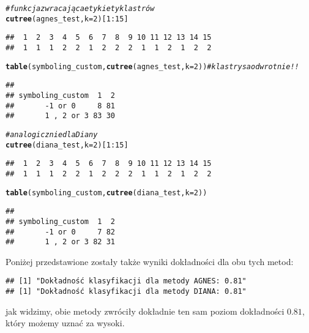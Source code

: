 \documentclass[12pt, a4paper]{article}\usepackage[]{graphicx}\usepackage[]{xcolor}
\makeatletter
\newcommand{\hlnum}[1]{\textcolor[rgb]{0.686,0.059,0.569}{#1}}%
\newcommand{\hlcom}[1]{\textcolor[rgb]{0.678,0.584,0.686}{\textit{#1}}}%
\newcommand{\hlopt}[1]{\textcolor[rgb]{0,0,0}{#1}}%
\newcommand{\hlstd}[1]{\textcolor[rgb]{0.345,0.345,0.345}{#1}}%
\newcommand{\hlkwc}[1]{\textcolor[rgb]{0.333,0.667,0.333}{#1}}%
\newcommand{\hlkwd}[1]{\textcolor[rgb]{0.737,0.353,0.396}{\textbf{#1}}}%
\newenvironment{kframe}{%
 \def\at@end@of@kframe{}%
 \ifinner\ifhmode%
  \def\at@end@of@kframe{\end{minipage}}%
  \begin{minipage}{\columnwidth}%
 \fi\fi%
 \def\FrameCommand##1{\hskip\@totalleftmargin \hskip-\fboxsep
 \colorbox{shadecolor}{##1}\hskip-\fboxsep
     \hskip-\linewidth \hskip-\@totalleftmargin \hskip\columnwidth}%
 \MakeFramed {\advance\hsize-\width
   \@totalleftmargin\z@ \linewidth\hsize
   \@setminipage}}%
 {\par\unskip\endMakeFramed%
 \at@end@of@kframe}
\newenvironment{knitrout}{}{} %
\makeatother
\begin{document}
\begin{knitrout}
\color{fgcolor}\begin{kframe}
\begin{alltt}
\hlcom{#funkcja zwracająca etykiety klastrów}
\hlkwd{cutree}\hlstd{(agnes_test,} \hlkwc{k}\hlstd{=}\hlnum{2}\hlstd{)[}\hlnum{1}\hlopt{:}\hlnum{15}\hlstd{]}
\end{alltt}
\begin{verbatim}
##  1  2  3  4  5  6  7  8  9 10 11 12 13 14 15 
##  1  1  1  2  2  1  2  2  2  1  1  2  1  2  2
\end{verbatim}
\begin{alltt}
\hlkwd{table}\hlstd{(symboling_custom,} \hlkwd{cutree}\hlstd{(agnes_test,} \hlkwc{k}\hlstd{=}\hlnum{2}\hlstd{))} \hlcom{#klastry sa odwrotnie!!}
\end{alltt}
\begin{verbatim}
##                 
## symboling_custom  1  2
##       -1 or 0     8 81
##       1 , 2 or 3 83 30
\end{verbatim}
\begin{alltt}
\hlcom{#analogicznie dla Diany}
\hlkwd{cutree}\hlstd{(diana_test,} \hlkwc{k}\hlstd{=}\hlnum{2}\hlstd{)[}\hlnum{1}\hlopt{:}\hlnum{15}\hlstd{]}
\end{alltt}
\begin{verbatim}
##  1  2  3  4  5  6  7  8  9 10 11 12 13 14 15 
##  1  1  1  2  2  1  2  2  2  1  1  2  1  2  2
\end{verbatim}
\begin{alltt}
\hlkwd{table}\hlstd{(symboling_custom,} \hlkwd{cutree}\hlstd{(diana_test,} \hlkwc{k}\hlstd{=}\hlnum{2}\hlstd{))}
\end{alltt}
\begin{verbatim}
##                 
## symboling_custom  1  2
##       -1 or 0     7 82
##       1 , 2 or 3 82 31
\end{verbatim}
\end{kframe}
\end{knitrout}
Poniżej przedstawione zostały także wyniki dokładności dla obu tych metod:
\begin{knitrout}
\color{fgcolor}\begin{kframe}
\begin{verbatim}
## [1] "Dokładność klasyfikacji dla metody AGNES: 0.81"
## [1] "Dokładność klasyfikacji dla metody DIANA: 0.81"
\end{verbatim}
\end{kframe}
\end{knitrout}
jak widzimy, obie metody zwróciły dokładnie ten sam poziom dokładności $0.81$, który możemy uznać za wysoki.
\end{document}
